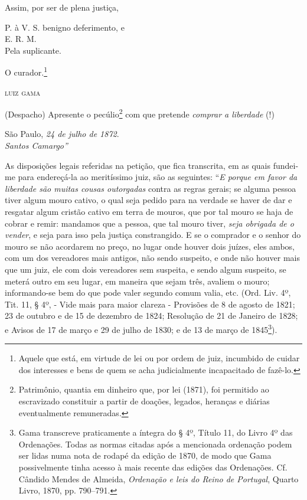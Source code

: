 {\begin{flushright}
Assim, por ser de plena justiça,

P. à V. S. benigno deferimento, e\\
E. R. M.\\
Pela suplicante.

O curador.\footnote{ Aquele que está, em virtude de lei ou por ordem de
  juiz, incumbido de cuidar dos interesses e bens de quem se acha
  judicialmente incapacitado de fazê-lo.}

\textsc{luiz gama}

(Despacho) Apresente o pecúlio\footnote{ Patrimônio, quantia em
  dinheiro que, por lei (1871), foi permitido ao escravizado constituir
  a partir de doações, legados, heranças e diárias eventualmente
  remuneradas.} com que pretende \emph{comprar a liberdade} (!)

São Paulo, \emph{24 de julho de 1872}.\\
\emph{Santos Camargo''}

As disposições legais referidas na petição, que fica transcrita, em as
quais fundei-me para endereçá-la ao meritíssimo juiz, são as seguintes:
``\emph{E porque em favor da liberdade são muitas cousas outorgadas}
contra as regras gerais; se alguma pessoa tiver algum mouro cativo, o
qual seja pedido para na verdade se haver de dar e resgatar algum
cristão cativo em terra de mouros, que por tal mouro se haja de cobrar e
remir: mandamos que a pessoa, que tal mouro tiver, \emph{seja obrigada
de o vender}, e seja para isso pela justiça constrangido. E se o
comprador e o senhor do mouro se não acordarem no preço, no lugar onde
houver dois juízes, eles ambos, com um dos vereadores mais antigos, não
sendo suspeito, e onde não houver mais que um juiz, ele com dois
vereadores sem suspeita, e sendo algum suspeito, se meterá outro em seu
lugar, em maneira que sejam três, avaliem o mouro; informando-se bem do
que pode valer segundo comum valia, etc. (Ord. Liv. 4º, Tit. 11, § 4º, -
Vide mais para maior clareza - Provisões de 8 de agosto de 1821; 23 de
outubro e de 15 de dezembro de 1824; Resolução de 21 de Janeiro de 1828;
e Avisos de 17 de março e 29 de julho de 1830; e de 13 de março de
1845\footnote{ Gama transcreve praticamente a íntegra do § 4º, Título
  11, do Livro 4º das Ordenações. Todas as normas citadas após a
  mencionada ordenação podem ser lidas numa nota de rodapé da edição de
  1870, de modo que Gama possivelmente tinha acesso à mais recente das
  edições das Ordenações. Cf. Cândido Mendes de Almeida, \emph{Ordenação
  e leis do Reino de Portugal}, Quarto Livro, 1870, pp. 790--791.}).


\end{flushright}}
